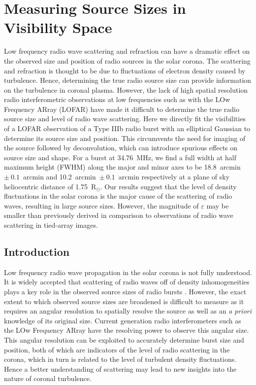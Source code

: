 \doublespacing
\chapter{Measuring Source Sizes in Visibility Space}
\label{chap:measuring_source_sizes}

Low frequency radio wave scattering and refraction can have a dramatic effect on the observed size and position of radio sources in the solar corona.
The scattering and refraction is thought to be due to fluctuations of electron density caused by turbulence. Hence, determining the true radio source size can provide information on the turbulence in coronal plasma.
However, the lack of high spatial resolution radio interferometric observations at low frequencies such as with the LOw Frequency ARray (LOFAR) have made it difficult to determine the true radio source size and level of radio wave scattering.
Here we directly fit the visibilities of a LOFAR observation of a Type IIIb radio burst with an elliptical Gaussian to determine its source size and position. This circumvents the need for imaging of the source followed by deconvolution, which can introduce spurious effects on source size and shape.
For a burst at 34.76~MHz, we find a full width at half maximum height (FWHM) along the major and minor axes to be 18.8~arcmin~$\pm~0.1$~arcmin and 10.2~arcmin~$\pm~0.1$~arcmin respectively at a plane of sky heliocentric distance of 1.75~R$_\odot$.
Our results suggest that the level of density fluctuations in the solar corona  is  the  major  cause  of  the  scattering  of  radio  waves, resulting in  large  source  sizes. However, the magnitude of $\varepsilon$ may be smaller than previously derived in comparison to observations of radio wave scattering in tied-array images.

\section{Introduction} \label{sec:intro}
Low frequency radio wave propagation in the solar corona is not fully understood. It is widely accepted that scattering of radio waves off of density inhomogeneities plays a key role in the observed source sizes of radio bursts \citep{Fokker1965,Steinberg1971,Stewart1972,Riddle1974,Thejappa2007,Thejappa2008,Kontar2019}. However, the exact extent to which observed source sizes are broadened is difficult to measure as it requires an angular resolution to spatially resolve the source as well as an \textit{a priori} knowledge of its original size.
Current generation radio interferometers such as the LOw Frequency ARray \citep[LOFAR;][]{VanHaarlem2013} have the resolving power to observe this angular size. This angular resolution can be exploited to accurately determine burst size and position, both of which are indicators of the level of radio scattering in the corona, which in turn is related to the level of turbulent density fluctuations. Hence a better understanding of scattering may lead to new insights into the nature of coronal turbulence.

